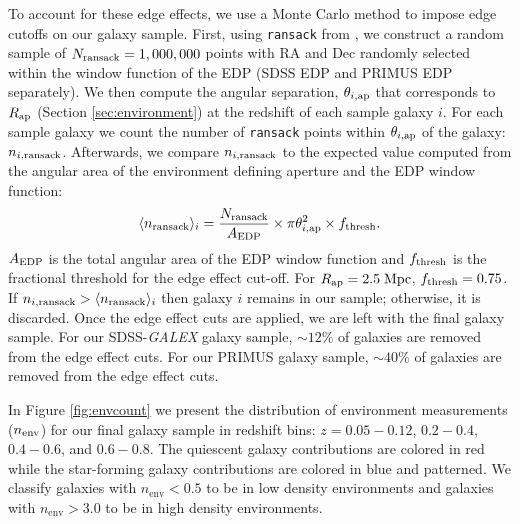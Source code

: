 \documentclass{emulateapj}
\def \apradius{2.5}
\begin{document}
To account for these edge effects, we use a Monte Carlo method to impose edge cutoffs on our galaxy sample. First, using \texttt{ransack} from \cite{Swanson:2008aa}, we construct a random sample of  $N_{\rm{ransack}} = 1,000,000$ points with RA and Dec randomly selected within the window function of the EDP (SDSS EDP and PRIMUS EDP separately). We then compute the angular separation, $\theta_{i, \rm{ap}}$ that corresponds to $R_{\rm{ap}}$ (Section \ref{sec:environment}) at the redshift of each sample galaxy $i$. For each sample galaxy we count the number of \texttt{ransack} points within $\theta_{i, \rm{ap}}$ of the galaxy: $n_{i,\rm{ransack}}$. Afterwards, we compare $n_{i,\rm{ransack}}$ to the expected value computed from the angular area of the environment defining aperture and the EDP window function: 
\begin{equation} \label{eq:ransack}
\langle n_{\rm{ransack}}\rangle_{i} = \frac{N_{\rm{ransack}}}{A_{\rm{EDP}}}\times {\pi \theta_{i, \rm{ap}}^2} \times f_{\rm{thresh}}. 
\end{equation} 
$A_{\rm{EDP}}$ is the total angular area of the EDP window function and $f_{\rm{thresh}}$ is the fractional threshold for the edge effect cut-off. For $R_{\rm{ap}}= \apradius \;\rm{Mpc}$, $f_{\rm{thresh}} = 0.75$. If $n_{i, \rm{ransack}} > \langle n_{\rm{ransack}} \rangle_i$ then galaxy $i$ remains in our sample; otherwise, it is discarded. Once the edge effect cuts are applied, we are left with the final galaxy sample. For our SDSS-{\em GALEX} galaxy sample, $\sim 12 \%$ of galaxies are removed from the edge effect cuts. For our PRIMUS galaxy sample, $\sim 40 \%$ of galaxies are removed from the edge effect cuts. 

In Figure \ref{fig:envcount} we present the distribution of environment measurements ($n_{\rm{env}}$) for our final galaxy sample in redshift bins: $z = 0.05 - 0.12$, $0.2 - 0.4$, $0.4-0.6$, and $0.6-0.8$. The quiescent galaxy contributions are colored in red while the star-forming galaxy contributions are colored in blue and patterned. We classify galaxies with $n_{\mathrm{env}} < 0.5$ to be in low density environments and galaxies with $n_{\mathrm{env}} > 3.0$ to be in high density environments. 
\end{document}
